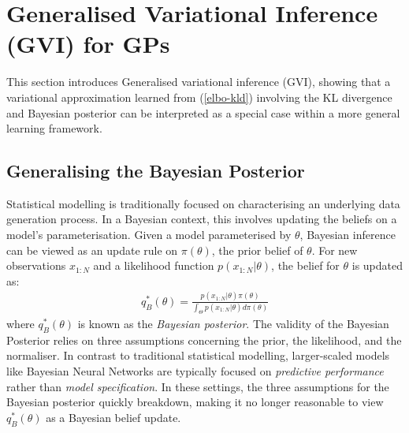 \documentclass{article}
\numberwithin{equation}{section}
\begin{document}
\newpage
\section{Generalised Variational Inference (GVI) for GPs}
This section introduces Generalised variational inference (GVI), showing that a variational approximation learned from (\ref{elbo-kld}) involving the KL divergence and Bayesian posterior can be interpreted as a special case within a more general learning framework.

\subsection{Generalising the Bayesian Posterior}
Statistical modelling is traditionally focused on characterising an underlying data generation process. In a Bayesian context, this involves updating the beliefs on a model's parameterisation. Given a model parameterised by $\theta$, Bayesian inference can be viewed as an update rule on $\pi(\theta)$, the prior belief of $\theta$. For new observations $x_{1:N}$ and a likelihood function $p(x_{1:N}|\theta)$, the belief for $\theta$ is updated as:
\begin{align}
q_B^*(\theta) = \frac{p(x_{1:N}|\theta) \pi(\theta)}{\int_{\Theta} p(x_{1:N}|\theta) d \pi(\theta)}
\label{bayesian-posterior}
\end{align}
where $q_B^*(\theta)$ is known as the \textit{Bayesian posterior}. The validity of the Bayesian Posterior relies on three assumptions concerning the prior, the likelihood, and the normaliser. In contrast to traditional statistical modelling, larger-scaled models like Bayesian Neural Networks are typically focused on \textit{predictive performance} rather than \textit{model specification}. In these settings, the three  assumptions for the Bayesian posterior quickly breakdown, making it no longer reasonable to view $q_B^*(\theta)$ as a Bayesian belief update.
\end{document}
